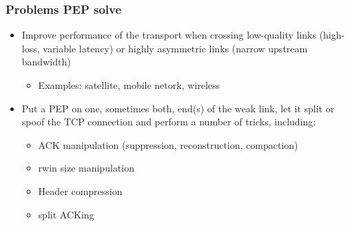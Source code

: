 \begin{frame}
  \frametitle{Problems PEP solve}
  \begin{itemize}
    \item Improve performance of the transport when crossing low-quality links (high-loss, variable latency) or highly asymmetric links (narrow upstream bandwidth)
    \begin{itemize}
      \item Examples: satellite, mobile netork, wireless
    \end{itemize}
    \item Put a PEP on one, sometimes both, end(s) of the weak link, let it split or spoof the TCP connection and perform a number of tricks, including:
    \begin{itemize}
      \item ACK manipulation (suppression, reconstruction, compaction)
      \item rwin size manipulation
      \item Header compression
      \item split ACKing
    \end{itemize}
  \end{itemize}
\end{frame}
